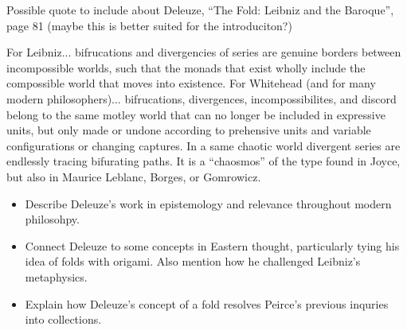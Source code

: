 Possible quote to include about Deleuze, ``The Fold: Leibniz and the Baroque'', page 81 (maybe this is better suited for the introduciton?)
\begin{displayquote}
For Leibniz... bifrucations and divergencies of series are genuine borders between incompossible worlds, such that the monads that exist wholly include the compossible world that moves into existence. For Whitehead (and for many modern philosophers)... bifrucations, divergences, incompossibilites, and discord belong to the same motley world that can no longer be included in expressive units, but only made or undone  according to prehensive units and variable configurations or changing captures. In a same chaotic world divergent series are endlessly tracing bifurating paths. It is a ``chaosmos'' of the  type found in Joyce, but also in Maurice Leblanc, Borges, or Gomrowicz.
\end{displayquote}

\begin{itemize}
  \item Describe Deleuze's work in epistemology and relevance throughout modern philosohpy.
  \item Connect Deleuze to some concepts in Eastern thought, particularly tying his idea of folds with origami. Also mention how he challenged Leibniz's metaphysics.
  \item Explain how Deleuze's concept of a fold resolves Peirce's previous inquries into collections.
\end{itemize}

